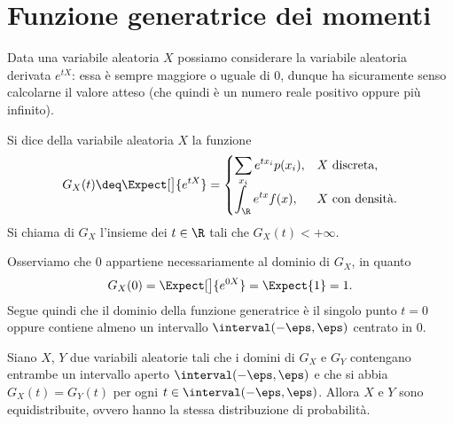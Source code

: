 \section{Funzione generatrice dei momenti}

Data una variabile aleatoria $X$ possiamo considerare la variabile aleatoria derivata $e^{tX}$: essa è sempre maggiore o uguale di $0$, dunque ha sicuramente senso calcolarne il valore atteso (che quindi è un numero reale positivo oppure più infinito).

\begin{definition}
    Si dice  della variabile aleatoria $X$ la funzione \[
        G_X(t) \deq \Expect[\big]{e^{tX}} = \begin{cases}
            \displaystyle \sum_{x_i} e^{tx_i}p(x_i), &X \text{ discreta},\\
            \displaystyle \int_{\R} e^{tx}f(x), &X \text{ con densità}.
        \end{cases}
    \] Si chiama  di $G_X$ l'insieme dei $t \in \R$ tali che $G_X(t) < +\infty$.
\end{definition}

Osserviamo che $0$ appartiene necessariamente al dominio di $G_X$, in quanto \[
    G_X(0) = \Expect[\big]{e^{0X}} = \Expect{1} = 1. 
\] Segue quindi che il dominio della funzione generatrice è il singolo punto $t = 0$ oppure contiene almeno un intervallo $\interval({-\eps, \eps})$ centrato in $0$.

\begin{theorem}
    Siano $X$, $Y$ due variabili aleatorie tali che i domini di $G_X$ e $G_Y$ contengano entrambe un intervallo aperto $\interval({-\eps, \eps})$ e che si abbia $G_X(t) = G_Y(t)$ per ogni $t \in \interval({-\eps, \eps})$. Allora $X$ e $Y$ sono equidistribuite, ovvero hanno la stessa distribuzione di probabilità.
\end{theorem}

